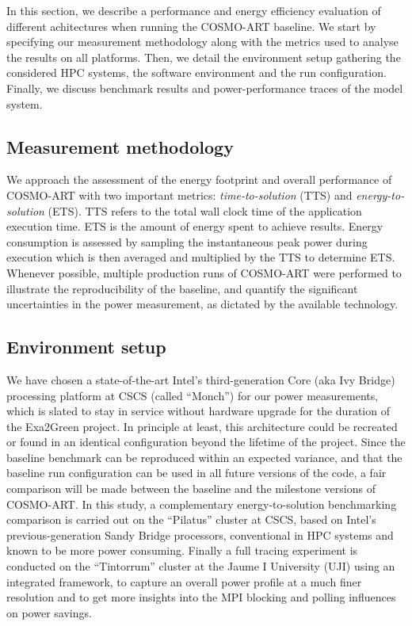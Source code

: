 In  this section,  we  describe a  performance  and energy  efficiency
evaluation  of  different  achitectures  when  running  the  COSMO-ART
baseline.  We  start by  specifying our measurement  methodology along
with the metrics used to  analyse the results on all platforms.  Then,
we detail the environment  setup gathering the considered HPC systems,
the  software  environment and  the  run  configuration.  Finally,  we
discuss benchmark  results and  power-performance traces of  the model
system.

\subsection{Measurement methodology}
\label{subsec:4.1}
We  approach  the  assessment  of  the energy  footprint  and  overall
performance    of    COSMO-ART    with    two    important    metrics:
\textit{time-to-solution} (TTS) and \textit{energy-to-solution} (ETS).
TTS refers to  the total wall clock time  of the application execution
time. ETS  is the amount of  energy spent to  achieve results.  Energy
consumption  is  assessed by  sampling  the  instantaneous peak  power
during execution which  is then averaged and multiplied  by the TTS to
determine  ETS.   Whenever   possible,  multiple  production  runs  of
COSMO-ART  were performed  to  illustrate the  reproducibility of  the
baseline,  and quantify  the  significant uncertainties  in the  power
measurement, as dictated by the available technology.

\subsection{Environment setup}
\label{subsec:4.2}
We have  chosen a state-of-the-art Intel's  third-generation Core (aka
Ivy  Bridge) processing platform  at CSCS  (called ``Monch'')  for our
power  measurements,  which  is  slated  to stay  in  service  without
hardware  upgrade  for the  duration  of  the  Exa2Green project.   In
principle at least,  this architecture could be recreated  or found in
an identical configuration beyond  the lifetime of the project.  Since
the baseline benchmark can  be reproduced within an expected variance,
and  that the baseline  run configuration  can be  used in  all future
versions  of the  code, a  fair comparison  will be  made  between the
baseline and  the milestone versions  of COSMO-ART.  In this  study, a
complementary  energy-to-solution benchmarking  comparison  is carried
out   on  the   ``Pilatus''  cluster   at  CSCS,   based   on  Intel's
previous-generation  Sandy  Bridge  processors,  conventional  in  HPC
systems and known to be  more power consuming.  Finally a full tracing
experiment is  conducted on the  ``Tintorrum'' cluster at the  Jaume I
University (UJI) using an  integrated framework, to capture an overall
power profile at a much finer resolution and to get more insights into
the MPI blocking and polling influences on power savings.

